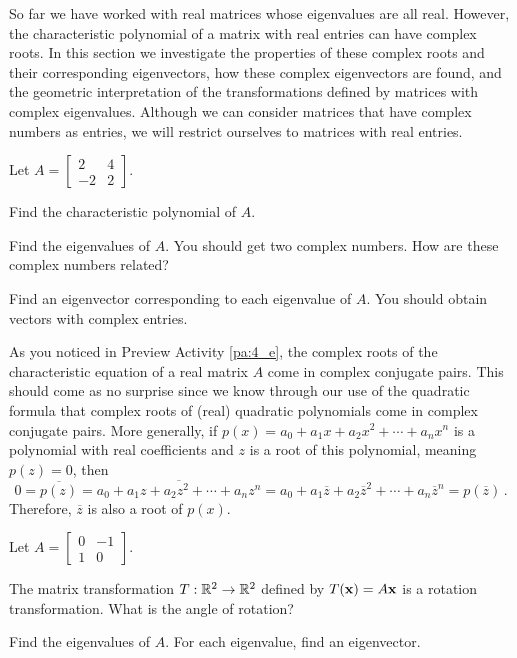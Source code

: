 \label{sec:comp_eigen_intro}

So far we have worked with real matrices whose eigenvalues are all real. However, the characteristic polynomial of a matrix with real entries can have complex roots. In this section we investigate the properties of these complex roots and their corresponding eigenvectors, how these complex eigenvectors are found, and the geometric interpretation of the transformations defined by matrices with complex eigenvalues. Although we can consider matrices that have complex numbers as entries, we will restrict ourselves to matrices with real entries. 

\begin{pa} \label{pa:4_e} Let $A = \left[ \begin{array}{rc} 2&4 \\ -2&2 \end{array} \right]$.
	\be
	\item Find the characteristic polynomial of $A$.

	\item Find the eigenvalues of $A$. You should get two complex numbers. How are these complex numbers related?

	\item Find an eigenvector corresponding to each eigenvalue of $A$. You should obtain vectors with complex entries.

	\ee
\end{pa}

\label{sec:comp_eigen}

As you noticed in Preview Activity \ref{pa:4_e}, the complex roots of the characteristic equation of a real matrix $A$ come in complex conjugate pairs. This should come as no surprise since we know through our use of the quadratic formula that complex roots of (real) quadratic polynomials come in complex conjugate pairs. More generally, if $p(x)=a_0+a_1x+a_2x^2 + \cdots + a_nx^n$ is a polynomial with real coefficients and $z$ is a root of this polynomial, meaning $p(z)=0$, then 
\[ 0=\overline{p(z)} = \overline{a_0+a_1z+a_2z^2 + \cdots + a_nz^n} = a_0 + a_1 \overline{z} + a_2 \overline{z}^2 + \cdots + a_n \overline{z}^n = p(\overline{z})\, .\]
Therefore, $\overline{z}$ is also a root of $p(x)$.

\begin{activity} \label{act:4e_1} Let $A=\left[ \begin{array}{cr} 0&-1 \\ 1&0 \end{array} \right]$. 

	\ba
	\item The matrix transformation $T:\mathbb{R}^2 \to \mathbb{R}^2$ defined by $T(\mathbf{x})=A\mathbf{x}$ is a rotation transformation. What is the angle of rotation?
	
	
	
	\item Find the eigenvalues of $A$. For each eigenvalue, find an eigenvector.

	
		
	\ea
\end{activity}



